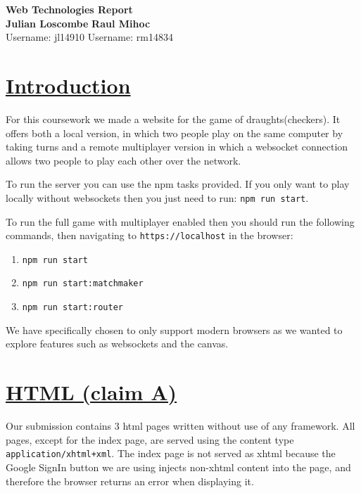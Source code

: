 \documentclass{article}
\begin{document}
 \begin{titlepage}
    \vspace*{4cm}
    \begin{center}
        \huge{\bfseries Web Technologies Report}\\
        \vspace*{10cm}
        \noindent
        \textbf{\large{Julian Loscombe}}
        \hfill
        \textbf{\large{Raul Mihoc}} \\
        \normalsize{\large{Username:} jl14910}
        \hfill
        \normalsize{\large{Username:} rm14834}
    \end{center}
 \end{titlepage}
 \section{\underline{Introduction}}\label{sec:intro}
    For this coursework we made a website for the game of draughts(checkers).
    It offers both a local version, in which two people play on the same computer by taking turns and a
    remote multiplayer version in which a websocket connection allows two people to play each other over the network.

    \indent To run the server you can use the npm tasks provided. If you only want to play locally without websockets
    then you just need to run: \verb|npm run start|.

    \indent To run the full game with multiplayer enabled then you should run the following
    commands, then navigating to \verb|https://localhost| in the browser:
    \begin{enumerate}
    \item \verb|npm run start|
    \item \verb|npm run start:matchmaker|
    \item \verb|npm run start:router|
    \end{enumerate}
    \indent We have specifically chosen to only support modern browsers as we wanted to explore features such as websockets and the canvas.
 \section{\underline{HTML (claim A)}}\label{sec:HTML}
    Our submission contains 3 html pages written without use of any framework. All pages, except for the index page, are served
    using the content type \verb|application/xhtml+xml|. The index page is not served as xhtml because the Google SignIn button we are using injects
    non-xhtml content into the page, and therefore the browser returns an error when displaying it.
\end{document}
